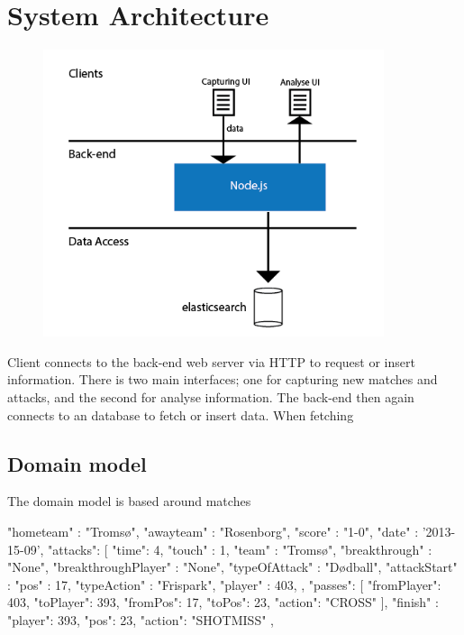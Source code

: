 

\section{System Architecture}

\begin{figure}[ht!]
\centering
\includegraphics[width=100mm]{images/general/arhitecture.png}
\caption{}
\label{overflow}
\end{figure}

Client connects to the back-end web server via HTTP to request or insert information. There is two main interfaces; one for capturing new matches and attacks, and the second for analyse information. The back-end then again connects to an database to fetch or insert data. When fetching 

\subsection{Domain model}

The domain model is based around matches

{     
    "hometeam" : "Tromsø",
    "awayteam" : "Rosenborg",
    "score" : "1-0",
    "date" : '2013-15-09',
    "attacks": [
        {
            "time": 4,
            "touch" : 1,
            "team" : "Tromsø",
            "breakthrough" : "None",
            "breakthroughPlayer" : "None",
            "typeOfAttack" : "Dødball",
            "attackStart" : {
                "pos" : 17,
                "typeAction" : "Frispark",
                "player" : 403,
            },
            "passes": [
                {
                    "fromPlayer": 403,
                    "toPlayer": 393,
                    "fromPos": 17,
                    "toPos": 23,
                    "action": "CROSS"
                }
            ],
            "finish" : {
                "player": 393,
                "pos": 23,
                "action": "SHOTMISS"
            }
        },
}

